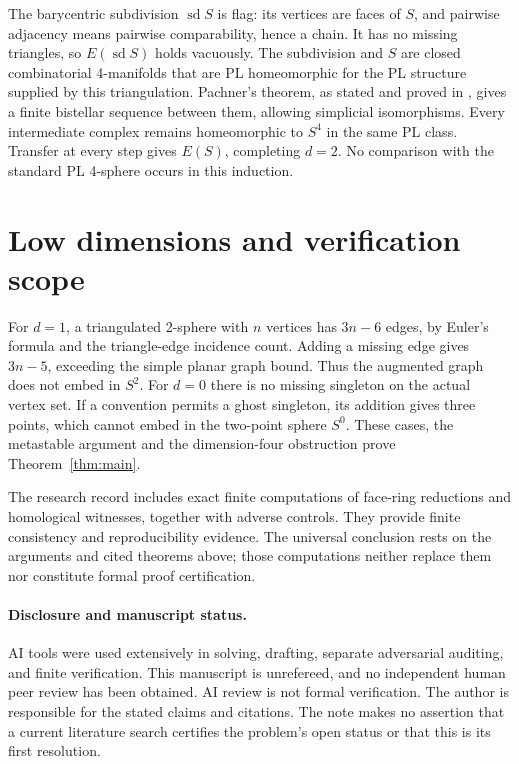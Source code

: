 \documentclass[11pt]{article}
\theoremstyle{remark}
\newcommand{\sd}{\operatorname{sd}}
\begin{document}
The barycentric subdivision $\sd S$ is flag: its vertices are faces
of $S$, and pairwise adjacency means pairwise comparability, hence a
chain. It has no missing triangles, so $E(\sd S)$ holds vacuously.
The subdivision and $S$ are closed combinatorial 4-manifolds that
are PL homeomorphic for the PL structure supplied by this
triangulation. Pachner's theorem, as stated and proved in
\cite[Theorem~5.9]{L}, gives a finite bistellar sequence between them,
allowing simplicial isomorphisms. Every intermediate complex remains
homeomorphic to $S^4$ in the same PL class. Transfer at every step
gives $E(S)$, completing $d=2$. No comparison with the standard
PL 4-sphere occurs in this induction.

\section{Low dimensions and verification scope}

For $d=1$, a triangulated 2-sphere with $n$ vertices has $3n-6$ edges,
by Euler's formula and the triangle-edge incidence count. Adding a
missing edge gives $3n-5$, exceeding the simple planar graph bound.
Thus the augmented graph does not embed in $S^2$. For $d=0$ there
is no missing singleton on the actual vertex set. If a convention
permits a ghost singleton, its addition gives three points, which
cannot embed in the two-point sphere $S^0$. These cases, the
metastable argument and the dimension-four obstruction prove
Theorem~\ref{thm:main}.

The research record includes exact finite computations of face-ring
reductions and homological witnesses, together with adverse controls.
They provide finite consistency and reproducibility evidence. The
universal conclusion rests on the arguments and cited theorems above;
those computations neither replace them nor constitute formal proof
certification.

\paragraph{Disclosure and manuscript status.}
AI tools were used extensively in solving, drafting, separate
adversarial auditing, and finite verification. This manuscript is
unrefereed, and no independent human peer review has been obtained.
AI review is not formal verification. The author is responsible for
the stated claims and citations. The note makes no assertion that a
current literature search certifies the problem's open status or that
this is its first resolution.
\end{document}

